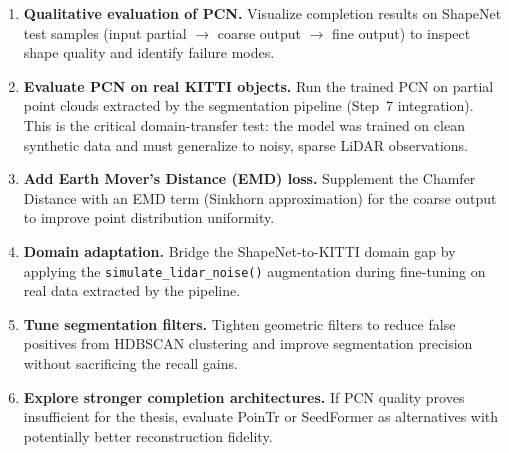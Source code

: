 \documentclass[a4paper, 12pt]{article}
\begin{document}
\begin{enumerate}
    \item \textbf{Qualitative evaluation of PCN.} Visualize completion results on ShapeNet test samples (input partial $\to$ coarse output $\to$ fine output) to inspect shape quality and identify failure modes.

    \item \textbf{Evaluate PCN on real KITTI objects.} Run the trained PCN on partial point clouds extracted by the segmentation pipeline (Step~7 integration). This is the critical domain-transfer test: the model was trained on clean synthetic data and must generalize to noisy, sparse LiDAR observations.

    \item \textbf{Add Earth Mover's Distance (EMD) loss.} Supplement the Chamfer Distance with an EMD term (Sinkhorn approximation) for the coarse output to improve point distribution uniformity.

    \item \textbf{Domain adaptation.} Bridge the ShapeNet-to-KITTI domain gap by applying the \texttt{simulate\_lidar\_noise()} augmentation during fine-tuning on real data extracted by the pipeline.

    \item \textbf{Tune segmentation filters.} Tighten geometric filters to reduce false positives from HDBSCAN clustering and improve segmentation precision without sacrificing the recall gains.

    \item \textbf{Explore stronger completion architectures.} If PCN quality proves insufficient for the thesis, evaluate PoinTr or SeedFormer as alternatives with potentially better reconstruction fidelity.
\end{enumerate}



\end{document}

